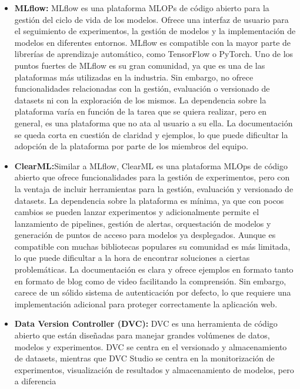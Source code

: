 \begin{itemize}
    \item \textbf{MLflow:} MLflow \cite{WhatMLflow} es una plataforma MLOPs de código abierto para la gestión del ciclo de vida de
    los modelos. Ofrece una interfaz de usuario para el seguimiento de experimentos, la gestión de modelos 
    y la implementación de modelos en diferentes entornos. MLflow es compatible con la mayor parte de librerías de aprendizaje 
    automático, como TensorFlow o PyTorch. Uno de los puntos fuertes de MLflow es su gran comunidad, ya que es
    una de las plataformas más utilizadas en la industria. Sin embargo, no ofrece funcionalidades relacionadas con
    la gestión, evaluación o versionado de datasets ni con la exploración de los mismos. La dependencia sobre la
    plataforma varía en función de la tarea que se quiera realizar, pero en general, es una plataforma que no
    ata al usuario a su ella. La documentación se queda corta en cuestión de claridad y ejemplos, lo que puede
    dificultar la adopción de la plataforma por parte de los miembros del equipo.
    \item \textbf{ClearML:}Similar a MLflow, ClearML \cite{WhatClearML} es una plataforma MLOps de código abierto que ofrece funcionalidades para la 
    gestión de experimentos, pero con la ventaja de incluir herramientas para la gestión, evaluación y 
    versionado de datasets. La dependencia sobre la plataforma es mínima, ya que con pocos cambios se pueden 
    lanzar experimentos y adicionalmente permite el lanzamiento de pipelines, gestión de alertas, orquestación de modelos 
    y generación de puntos de acceso para modelos ya desplegados. Aunque es compatible con muchas bibliotecas populares su comunidad 
    es más limitada, lo que puede dificultar a la hora de encontrar soluciones a ciertas problemáticas.
    La documentación es clara y ofrece ejemplos en formato tanto en formato de blog como de video facilitando la 
    comprensión. Sin embargo, carece de un sólido sistema de autenticación por defecto, lo que requiere una
    implementación adicional para proteger correctamente la aplicación web.
    \item \textbf{Data Version Controller (DVC):} DVC \cite{dvc} es una herramienta de código abierto que
    están diseñadas para manejar grandes volúmenes de datos, modelos y experimentos. DVC
    se centra en el versionado y almacenamiento de datasets, mientras que DVC Studio se centra en la
    monitorización de experimentos, visualización de resultados y almacenamiento de modelos, pero a diferencia

\end{itemize}
